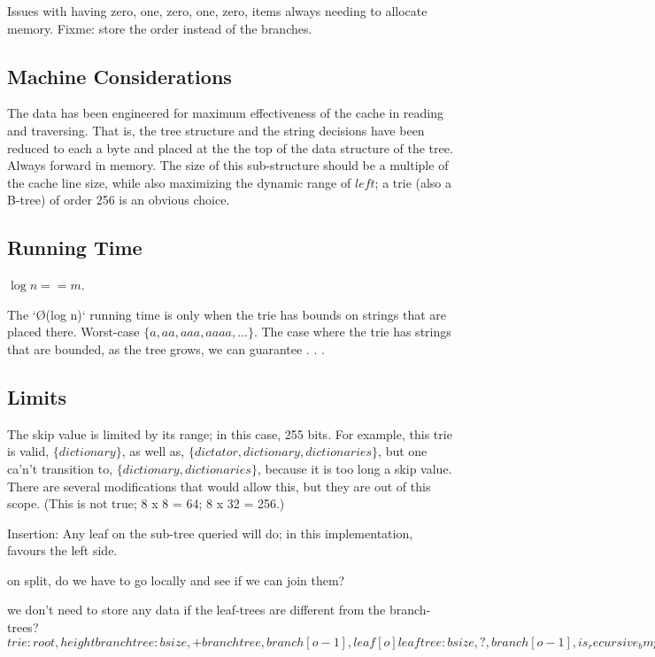 \documentclass[12pt]{article}
\begin{document}
Issues with having zero, one, zero, one, zero, items always needing to allocate memory. Fixme: store the order instead of the branches.

\subsection{Machine Considerations}

The data has been engineered for maximum effectiveness of the cache in reading and traversing. That is, the tree structure and the string decisions have been reduced to each a byte and placed at the the top of the data structure of the tree. Always forward in memory. The size of this sub-structure should be a multiple of the cache line size, while also maximizing the dynamic range of $\mathit{left}$; a trie (also a B-tree) of order 256 is an obvious choice.\cite{sinha2004cache}

\subsection{Running Time}

\cite{shannon1948mathematical} $\log n == m$.

The `\O(log n)` running time is only when the trie has bounds on strings that are placed there. Worst-case $\{ a, aa, aaa, aaaa, ... \}$. The case where the trie has strings that are bounded, as the tree grows, we can guarantee . . .

\subsection{Limits}

The skip value is limited by its range; in this case, 255 bits. For example, this trie is valid, $\{ dictionary \}$, as well as, $\{ dictator, dictionary, dictionaries \}$, but one ca'n't transition to, $\{ dictionary, dictionaries \}$, because it is too long a skip value. There are several modifications that would allow this, but they are out of this scope. (This is not true; 8 x 8 = 64; 8 x 32 = 256.)

Insertion: Any leaf on the sub-tree queried will do; in this implementation, favours the left side.

on split, do we have to go locally and see if we can join them?

we don't need to store any data if the leaf-trees are different from the branch-trees?
$
trie: root, height
branch tree: bsize, +branchtree, branch[o-1], leaf[o]
leaf tree: bsize, ?, branch[o-1], is_recursive_bmp[o/8], leaf[o]
or
leaf tree: bsize, ?, branch[o-1], leaf[o] { skip, union{ data, trie } }
or
leaf tree: bsize, ?, branch[o-1], leaf[o] { 32:skip, 32:height, 64:root / 64:data }
$


\end{document}
